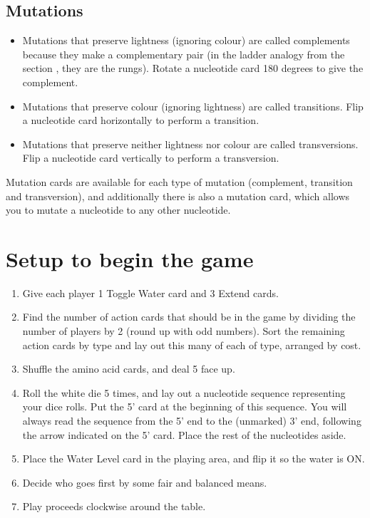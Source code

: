 \documentclass[a4paper,11pt,oneside]{memoir}
\begin{document}

\subsection*{Mutations}

\begin{itemize}
    \item Mutations that preserve lightness (ignoring colour) are called complements because they make a complementary pair (in the ladder analogy from the section \textbf{}, they are the rungs).  Rotate a nucleotide card 180 degrees to give the complement.
    \item Mutations that preserve colour (ignoring lightness) are called transitions.  Flip a nucleotide card horizontally to perform a transition.
    \item Mutations that preserve neither lightness nor colour are called transversions.  Flip a nucleotide card vertically to perform a transversion. \\
\end{itemize}

Mutation cards are available for each type of mutation (complement, transition and transversion), and additionally there is also a mutation card, which allows you to mutate a nucleotide to any other nucleotide. 


\section*{Setup to begin the game}

\begin{enumerate}
    \item Give each player 1 Toggle Water card and 3 Extend cards.
    \item Find the number of action cards that should be in the game by dividing the number of players by 2 (round up with odd numbers).  Sort the remaining action cards by type and lay out this many of each of type, arranged by cost.
    \item Shuffle the amino acid cards, and deal 5 face up.  
    \item Roll the white die 5 times, and lay out a nucleotide sequence representing your dice rolls.  Put the 5' card at the beginning of this sequence.  You will always read the sequence from the 5' end to the (unmarked) 3' end, following the arrow indicated on the 5' card.  Place the rest of the nucleotides aside. 
    \item Place the Water Level card in the playing area, and flip it so the water is ON.
    \item Decide who goes first by some fair and balanced means.
    \item Play proceeds clockwise around the table.\\
\end{enumerate}
\end{document}
